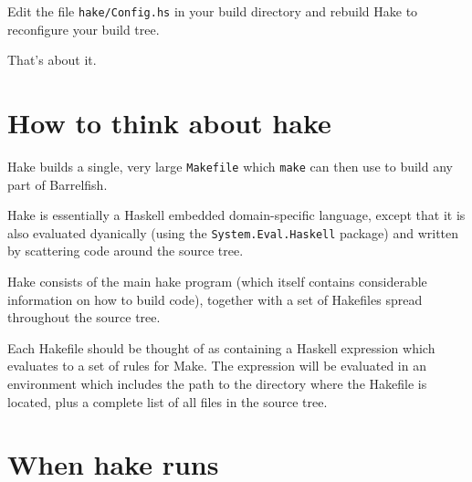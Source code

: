 \documentclass[a4paper,twoside]{report} %
\begin{document}
Edit the file \texttt{hake/Config.hs} in your build directory and
rebuild Hake to reconfigure your build tree.

That's about it.

\section{How to think about hake}

Hake builds a single, very large \texttt{Makefile} which
\texttt{make} can then use to build any part of Barrelfish.

Hake is essentially a Haskell embedded domain-specific language,
except that it is also evaluated dyanically (using the
\texttt{System.Eval.Haskell} package) and written by scattering code
around the source tree.

Hake consists of the main hake program (which itself contains
considerable information on how to build code), together with a set of
Hakefiles spread throughout the source tree.

Each Hakefile should be thought of as containing a Haskell expression
which evaluates to a set of rules for Make.  The expression will be
evaluated in an environment which includes the path to the directory
where the Hakefile is located, plus a complete list of all files in
the source tree.

\section{When hake runs}
\end{document}
